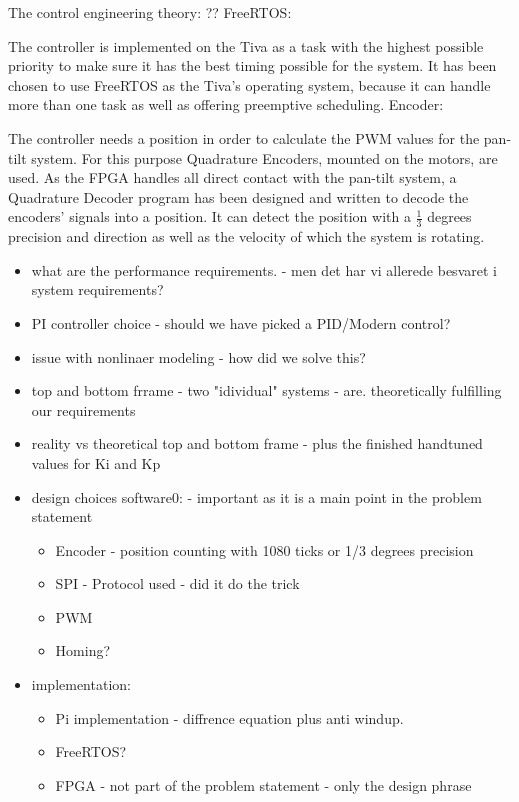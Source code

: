 \documentclass[../../main]{subfiles}
\begin{document}
The control engineering theory:
??
FreeRTOS:

The controller is implemented on the Tiva as a task with the highest possible priority to make sure it has the best timing possible for the system. It has been chosen to use FreeRTOS as the Tiva's operating system, because it can handle more than one task as well as offering preemptive scheduling.
Encoder:

The controller needs a position in order to calculate the PWM values for the pan-tilt system. For this purpose Quadrature Encoders, mounted on the motors, are used.
As the FPGA handles all direct contact with the pan-tilt system, a Quadrature Decoder program has been designed and written to decode the encoders' signals into a position.
It can detect the position with a $\frac{1}{3}$ degrees precision and direction as well as the velocity of which the system is rotating.

\begin{itemize}
  \item what are the performance requirements. - men det har vi allerede besvaret i system requirements?
  \item PI controller choice - should we have picked a PID/Modern control?
  \item issue with nonlinaer modeling - how did we solve this?
  \item top and bottom frrame - two "idividual" systems - are. theoretically fulfilling our requirements
  \item reality vs theoretical top and bottom frame - plus the finished handtuned values for Ki and Kp
  \item design choices software0: - important as it is a main point in the problem statement
    \begin{itemize}
      \item Encoder - position counting with 1080 ticks or 1/3 degrees precision
      \item SPI - Protocol used - did it do the trick
      \item PWM
      \item Homing?
    \end{itemize}
  \item implementation:
    \begin{itemize}
      \item Pi implementation - diffrence equation plus anti windup.
      \item FreeRTOS?
      \item FPGA - not part of the problem statement - only the design phrase
    \end{itemize}

\end{itemize}
\end{document}
